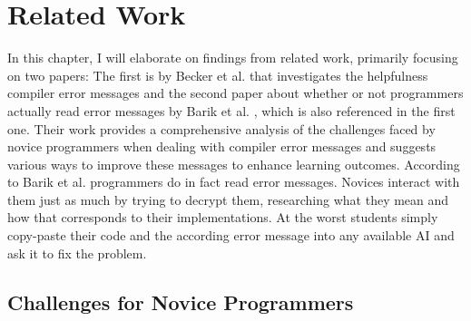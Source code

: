 \chapter{Related Work} %


In this chapter, I will elaborate on findings from related work, primarily focusing on two papers:
The first is by Becker et al. \cite{becker} that investigates the helpfulness compiler error messages
and the second paper about whether or not programmers actually read error messages by Barik et al. \cite{barik}, which is also referenced in the first one.
Their work provides a comprehensive analysis of the challenges faced by novice programmers when dealing with compiler error messages and
suggests various ways to improve these messages to enhance learning outcomes.
According to Barik et al. \cite{barik} programmers do in fact read error messages. Novices interact with them just as much by trying to decrypt them, researching what they mean
and how that corresponds to their implementations.
At the worst students simply copy-paste their code and the according error message into any available AI and ask it to fix the problem.


\section{Challenges for Novice Programmers} %



